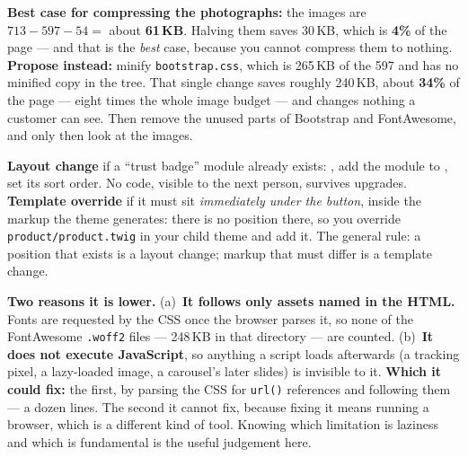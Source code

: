 \begin{ans}
  \item \textbf{Best case for compressing the photographs:} the images are
        $713 - 597 - 54 = $ about \textbf{61\,KB}. Halving them saves 30\,KB,
        which is \textbf{4\%} of the page --- and that is the \emph{best} case,
        because you cannot compress them to nothing. \textbf{Propose instead:}
        minify \texttt{bootstrap.css}, which is 265\,KB of the 597 and has no
        minified copy in the tree. That single change saves roughly 240\,KB,
        about \textbf{34\%} of the page --- eight times the whole image budget
        --- and changes nothing a customer can see. Then remove the unused
        parts of Bootstrap and FontAwesome, and only then look at the images.
  \item \textbf{Layout change} if a ``trust badge'' module already exists:
        , add the module to
        , set its sort order. No code, visible to the next
        person, survives upgrades. \textbf{Template override} if it must sit
        \emph{immediately under the button}, inside the markup the theme
        generates: there is no position there, so you override
        \texttt{product/product.twig} in your child theme and add it. The
        general rule: a position that exists is a layout change; markup that
        must differ is a template change.
  \item \textbf{Two reasons it is lower.} (a)~\textbf{It follows only assets
        named in the HTML.} Fonts are requested by the CSS once the browser
        parses it, so none of the FontAwesome \texttt{.woff2} files --- 248\,KB
        in that directory --- are counted. (b)~\textbf{It does not execute
        JavaScript}, so anything a script loads afterwards (a tracking pixel,
        a lazy-loaded image, a carousel's later slides) is invisible to it.
        \smallskip
        \textbf{Which it could fix:} the first, by parsing the CSS for
        \texttt{url()} references and following them --- a dozen lines. The
        second it cannot fix, because fixing it means running a browser, which
        is a different kind of tool. Knowing which limitation is laziness and
        which is fundamental is the useful judgement here.
\end{ans}

